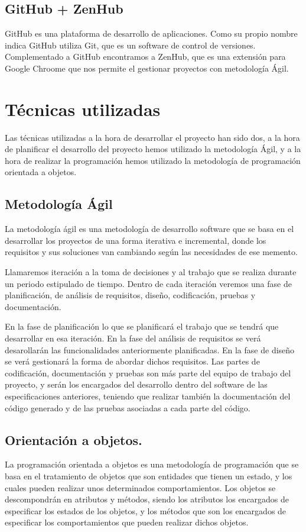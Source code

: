 \subsection{GitHub + ZenHub}
GitHub es una plataforma de desarrollo de aplicaciones. Como su propio nombre indica GitHub utiliza Git, que es un software de control de versiones.
Complementado a GitHub encontramos a ZenHub, que es una extensión para Google Chroome que nos permite el gestionar proyectos con metodología Ágil.

\section{Técnicas utilizadas}

Las técnicas utilizadas a la hora de desarrollar el proyecto han sido dos, a la hora de planificar el desarrollo del proyecto hemos utilizado la metodología Ágil, y a la hora de realizar la programación hemos utilizado la metodología de programación orientada a objetos.

\subsection{Metodología Ágil}

La metodología ágil es una metodología de desarrollo software que se basa en el desarrollar los proyectos de una forma iterativa e incremental, donde los requisitos y sus soluciones van cambiando según las necesidades de ese memento.

Llamaremos iteración a la toma de decisiones y al trabajo que se realiza durante un periodo estipulado de tiempo. Dentro de cada iteración veremos una fase de planificación, de análisis de requisitos, diseño, codificación, pruebas y documentación.

En la fase de planificación lo que se planificará el trabajo que se tendrá que desarrollar en esa iteración. En la fase del análisis de requisitos se verá desarollarán las funcionalidades anteriormente planificadas. En la fase de diseño se verá gestionará la forma de abordar dichos requisitos. Las partes de codificación, documentación y pruebas son más parte del equipo de trabajo del proyecto, y serán los encargados del desarrollo dentro del software de las especificaciones anteriores, teniendo que realizar también la documentación del código generado y de las pruebas asociadas a cada parte del código.\cite{agil}

\subsection{Orientación a objetos.}
La programación orientada a objetos es una metodología de programación que se basa en el tratamiento de objetos que son entidades que tienen un estado, y los cuales pueden realizar unos determinados comportamientos.
Los objetos se descompondrán en atributos y métodos, siendo los atributos los encargados de especificar los estados de los objetos, y los métodos que son los encargados de especificar los comportamientos que pueden realizar dichos objetos.

